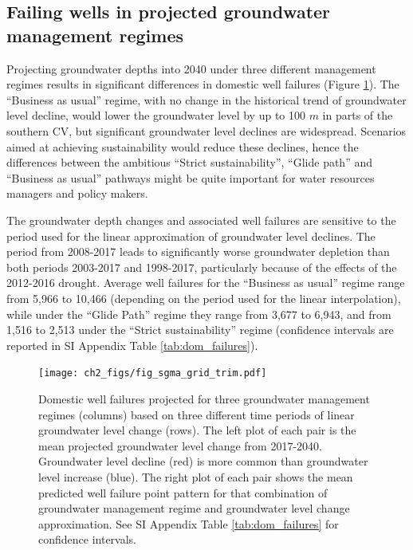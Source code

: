\subsection{Failing wells in projected groundwater management regimes}

Projecting groundwater depths into 2040 under three different management regimes results in significant differences in domestic well failures (Figure \ref{fig:sgma_grid}). The ``Business as usual'' regime, with no change in the historical trend of groundwater level decline, would lower the groundwater level by up to 100 $m$ in parts of the southern CV, but significant groundwater level declines are widespread. Scenarios aimed at achieving sustainability would reduce these declines, hence the differences between the ambitious ``Strict sustainability'', ``Glide path'' and ``Business as usual'' pathways might be quite important for water resources managers and policy makers.

The groundwater depth changes and associated well failures are sensitive to the period used for the linear approximation of groundwater level declines. The period from 2008-2017 leads to significantly worse groundwater depletion than both periods 2003-2017 and 1998-2017, particularly because of the effects of the 2012-2016 drought. Average well failures for the ``Business as usual'' regime range from 5,966 to 10,466 (depending on the period used for the linear interpolation), while under the ``Glide Path'' regime they range from 3,677 to 6,943, and from 1,516 to 2,513 under the ``Strict sustainability'' regime (confidence intervals are reported in SI Appendix Table \ref{tab:dom_failures}).  

\begin{figure}
	\texttt{[image: ch2\_figs/fig\_sgma\_grid\_trim.pdf]}
	\caption{Domestic well failures projected for three groundwater management regimes (columns) based on three different time periods of linear groundwater level change (rows). The left plot of each pair is the mean projected groundwater level change from 2017-2040. Groundwater level decline (red) is more common than groundwater level increase (blue). The right plot of each pair shows the mean predicted well failure point pattern for that combination of groundwater management regime and groundwater level change approximation. See SI Appendix Table \ref{tab:dom_failures} for confidence intervals.}
	\label{fig:sgma_grid}
\end{figure}
\clearpage

